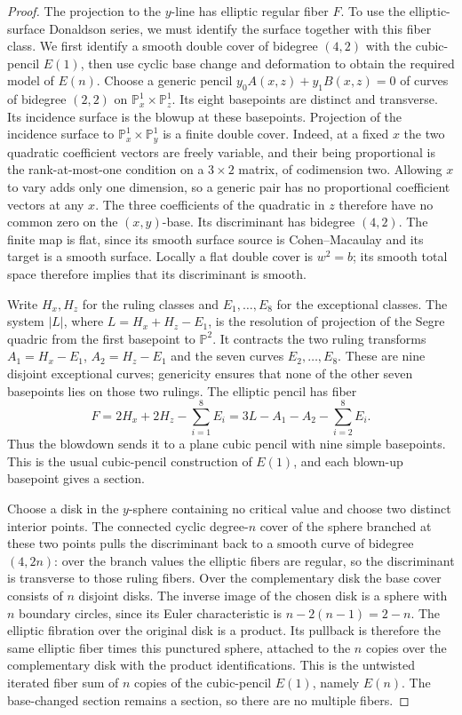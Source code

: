 \begin{proof}
The projection to the $y$-line has elliptic regular fiber $F$.
To use the elliptic-surface Donaldson series, we must identify the
surface together with this fiber class.  We first identify a smooth double cover of bidegree
$(4,2)$ with the cubic-pencil $E(1)$, then use cyclic base change and
deformation to obtain the required model of $E(n)$.
Choose a generic pencil
\(y_0A(x,z)+y_1B(x,z)=0\) of curves of bidegree \((2,2)\) on \(\mathbb
P^1_x\times\mathbb P^1_z\). Its eight basepoints are distinct and transverse.
Its incidence surface is the blowup at these basepoints. Projection of the
incidence surface to \(\mathbb P^1_x\times\mathbb P^1_y\) is a finite double
cover. Indeed, at a fixed \(x\) the two quadratic coefficient vectors are
freely variable, and their being proportional is the rank-at-most-one
condition on a \(3\times2\) matrix, of codimension two. Allowing \(x\) to vary
adds only one dimension, so a generic pair has no proportional coefficient
vectors at any \(x\). The three coefficients of the quadratic in \(z\)
therefore have no common zero on the \((x,y)\)-base. Its discriminant has
bidegree \((4,2)\). The finite map is flat, since its smooth surface source is
Cohen–Macaulay and its target is a smooth surface. Locally a flat double cover
is \(w^2=b\); its smooth total space therefore implies that its discriminant
is smooth.

Write \(H_x,H_z\) for the ruling classes and \(E_1,\ldots,E_8\) for the
exceptional classes. The system \(|L|\), where \(L=H_x+H_z-E_1\), is the
resolution of projection of the Segre quadric from the first basepoint to
\(\mathbb P^2\). It contracts the two ruling transforms \(A_1=H_x-E_1\),
\(A_2=H_z-E_1\) and the seven curves \(E_2,\ldots,E_8\). These are nine
disjoint exceptional curves; genericity ensures that none of the other seven
basepoints lies on those two rulings. The elliptic pencil has fiber \[
F=2H_x+2H_z-\sum_{i=1}^{8}E_i   =3L-A_1-A_2-\sum_{i=2}^{8}E_i. \] Thus the
blowdown sends it to a plane cubic pencil with nine simple basepoints. This is
the usual cubic-pencil construction of \(E(1)\), and each blown-up basepoint
gives a section.

Choose a disk in the \(y\)-sphere containing no critical value and choose two
distinct interior points. The connected cyclic degree-\(n\) cover of the
sphere branched at these two points pulls the discriminant back to a smooth
curve of bidegree \((4,2n)\): over the branch values the elliptic fibers are
regular, so the discriminant is transverse to those ruling fibers. Over the
complementary disk the base cover consists of \(n\) disjoint disks. The
inverse image of the chosen disk is a sphere with \(n\) boundary circles,
since its Euler characteristic is \(n-2(n-1)=2-n\). The elliptic fibration
over the original disk is a product. Its pullback is therefore the same
elliptic fiber times this punctured sphere, attached to the \(n\) copies over
the complementary disk with the product identifications. This is the untwisted
iterated fiber sum of \(n\) copies of the cubic-pencil \(E(1)\), namely
\(E(n)\). The base-changed section remains a section, so there are no multiple
fibers.


\end{proof}
